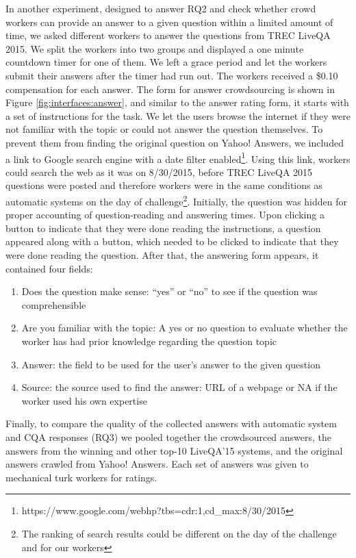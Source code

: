 \documentclass[11pt,letterpaper]{article}
\begin{document}
In another experiment, designed to answer RQ2 and check whether crowd workers can provide an answer to a given question within a limited amount of time, we asked different workers to answer the questions from TREC LiveQA 2015.
We split the workers into two groups and displayed a one minute countdown timer for one of them.
We left a grace period and let the workers submit their answers after the timer had run out.
The workers received a \$0.10 compensation for each answer.
The form for answer crowdsourcing is shown in Figure \ref{fig:interfaces:answer}, and similar to the answer rating form, it starts with a set of instructions for the task.
We let the users browse the internet if they were not familiar with the topic or could not answer the question themselves.
To prevent them from finding the original question on Yahoo! Answers, we included a link to Google search engine with a date filter enabled\footnote{https://www.google.com/webhp?tbs=cdr:1,cd\_max:8/30/2015}.
Using this link, workers could search the web as it was on 8/30/2015, before TREC LiveQA 2015 questions were posted and therefore workers were in the same conditions as automatic systems on the day of challenge\footnote{The ranking of search results could be different on the day of the challenge and for our workers}.
Initially, the question was hidden for proper accounting of question-reading and answering times.
Upon clicking a button to indicate that they were done reading the instructions, a question appeared along with a button, which needed to be clicked to indicate that they were done reading the question.
After that, the answering form appears, it contained four fields:
\vspace{-0.4cm}
\begin{enumerate}
\setlength{\itemsep}{0pt}
\setlength{\parskip}{0pt}
\item Does the question make sense: ``yes'' or ``no'' to see if the question was comprehensible
\item Are you familiar with the topic: A yes or no question to evaluate whether the worker has had prior knowledge regarding the question topic
\item Answer: the field to be used for the user's answer to the given question
\item Source: the source used to find the answer: URL of a webpage or NA if the worker used his own expertise
\end{enumerate}

\vspace{-0.4cm}
Finally, to compare the quality of the collected answers with automatic system and CQA responses (RQ3) we pooled together the crowdsourced answers, the answers from the winning and other top-10 LiveQA'15 systems, and the original answers crawled from Yahoo! Answers.
Each set of answers was given to mechanical turk workers for ratings.
\end{document}
